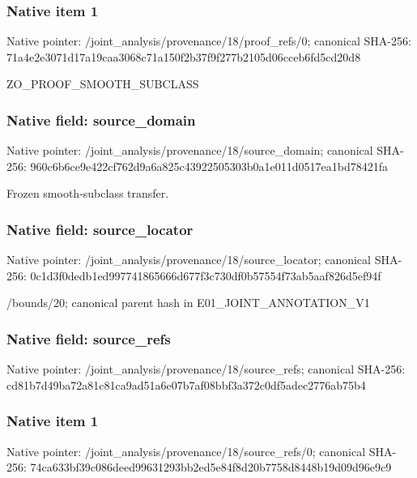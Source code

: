 \documentclass[10pt,a4paper]{article}
\begin{document}
\subsubsection{Native item 1}
Native pointer: /joint\_\allowbreak{}analysis/provenance/18/proof\_\allowbreak{}refs/0; canonical SHA-256: 71a4e2e3071d17a19caa3068c71a150f2b37f9f277b2105d06cceb6fd5cd20d8

\begingroup\raggedright\sloppy ZO\_\allowbreak{}PROOF\_\allowbreak{}SMOOTH\_\allowbreak{}SUBCLASS\par\endgroup

\subsubsection{Native field: source\_\allowbreak{}domain}
Native pointer: /joint\_\allowbreak{}analysis/provenance/18/source\_\allowbreak{}domain; canonical SHA-256: 960c6b6ce9e422cf762d9a6a825c43922505303b0a1e011d0517ea1bd78421fa

\begingroup\raggedright\sloppy Frozen smooth-subclass transfer.\par\endgroup

\subsubsection{Native field: source\_\allowbreak{}locator}
Native pointer: /joint\_\allowbreak{}analysis/provenance/18/source\_\allowbreak{}locator; canonical SHA-256: 0c1d3f0dedb1ed997741865666d677f3c730df0b57554f73ab5aaf826d5ef94f

\begingroup\raggedright\sloppy /\allowbreak{}bounds/\allowbreak{}20;\allowbreak{} canonical parent hash in E01\_\allowbreak{}JOINT\_\allowbreak{}ANNOTATION\_\allowbreak{}V1\par\endgroup

\subsubsection{Native field: source\_\allowbreak{}refs}
Native pointer: /joint\_\allowbreak{}analysis/provenance/18/source\_\allowbreak{}refs; canonical SHA-256: cd81b7d49ba72a81c81ca9ad51a6e07b7af08bbf3a372c0df5adec2776ab75b4

\subsubsection{Native item 1}
Native pointer: /joint\_\allowbreak{}analysis/provenance/18/source\_\allowbreak{}refs/0; canonical SHA-256: 74ca633bf39c086deed99631293bb2ed5e84f8d20b7758d8448b19d09d96e9c9
\end{document}
